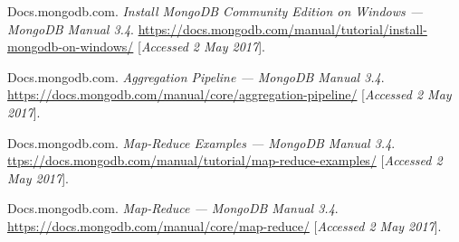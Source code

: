 \documentclass[11pt]{article}
\begin{document}
\begin{thebibliography}{9}
									
	Docs.mongodb.com.
	\textit{ Install MongoDB Community Edition on Windows — MongoDB Manual 3.4}. 
	\url {https://docs.mongodb.com/manual/tutorial/install-mongodb-on-windows/}
	[\textit{Accessed 2 May 2017}].
	
	Docs.mongodb.com.
	\textit{ Aggregation Pipeline — MongoDB Manual 3.4}. 
	\url { https://docs.mongodb.com/manual/core/aggregation-pipeline/}
	[\textit{Accessed 2 May 2017}].
	
	Docs.mongodb.com.
	\textit{Map-Reduce Examples — MongoDB Manual 3.4}. 
	\url { ttps://docs.mongodb.com/manual/tutorial/map-reduce-examples/}
	[\textit{Accessed 2 May 2017}].
	
	Docs.mongodb.com.
	\textit{Map-Reduce — MongoDB Manual 3.4}. 
	\url {https://docs.mongodb.com/manual/core/map-reduce/}
	[\textit{Accessed 2 May 2017}]. 
	
	
									
\end{thebibliography}
\end{document}
